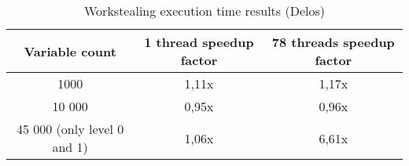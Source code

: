 \begin{table}[H]
  \centering
  \begin{tabular}{||c | c | c||} 
   \hline
   Variable count & 1 thread speedup factor & 78 threads speedup factor \\ [0.5ex] 
   \hline\hline\hline
   1000 & 1,11x & 1,17x \\
   10 000 & 0,95x & 0,96x \\ 
   45 000 (only level 0 and 1) & 1,06x & 6,61x \\ [1ex] 
   \hline
  \end{tabular}
  \caption{Workstealing execution time results (Delos)}
  \label{table:workst_delos_scaling}
\end{table}